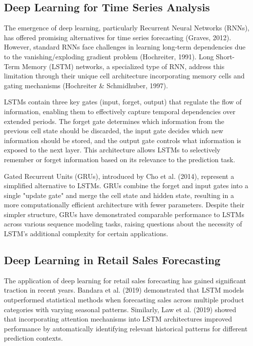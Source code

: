 \documentclass[conference]{IEEEtran}
\begin{document}
\subsection{Deep Learning for Time Series Analysis}
The emergence of deep learning, particularly Recurrent Neural Networks (RNNs), has offered promising alternatives for time series forecasting (Graves, 2012). However, standard RNNs face challenges in learning long-term dependencies due to the vanishing/exploding gradient problem (Hochreiter, 1991). Long Short-Term Memory (LSTM) networks, a specialized type of RNN, address this limitation through their unique cell architecture incorporating memory cells and gating mechanisms (Hochreiter \& Schmidhuber, 1997).

LSTMs contain three key gates (input, forget, output) that regulate the flow of information, enabling them to effectively capture temporal dependencies over extended periods. The forget gate determines which information from the previous cell state should be discarded, the input gate decides which new information should be stored, and the output gate controls what information is exposed to the next layer. This architecture allows LSTMs to selectively remember or forget information based on its relevance to the prediction task.

Gated Recurrent Units (GRUs), introduced by Cho et al. (2014), represent a simplified alternative to LSTMs. GRUs combine the forget and input gates into a single "update gate" and merge the cell state and hidden state, resulting in a more computationally efficient architecture with fewer parameters. Despite their simpler structure, GRUs have demonstrated comparable performance to LSTMs across various sequence modeling tasks, raising questions about the necessity of LSTM's additional complexity for certain applications.

\subsection{Deep Learning in Retail Sales Forecasting}
The application of deep learning for retail sales forecasting has gained significant traction in recent years. Bandara et al. (2019) demonstrated that LSTM models outperformed statistical methods when forecasting sales across multiple product categories with varying seasonal patterns. Similarly, Law et al. (2019) showed that incorporating attention mechanisms into LSTM architectures improved performance by automatically identifying relevant historical patterns for different prediction contexts.
\end{document}
